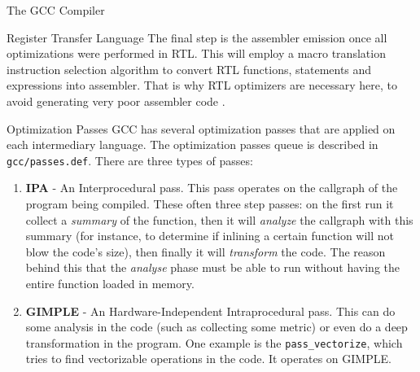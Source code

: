 \begin{section}{The GCC Compiler}
\begin{subsection}{Register Transfer Language}
	The final step is the assembler emission once all optimizations were
	performed in RTL. This will employ a macro translation instruction
	selection algorithm to convert RTL functions, statements and expressions
	into assembler. That is why RTL optimizers are necessary here, to avoid
	generating very poor assembler code \citep{gcc_insns_selection}.

%


\end{subsection}

\begin{subsection}{Optimization Passes}
	GCC has several optimization passes that are applied on each intermediary
	language. The optimization passes queue is described in
	\texttt{gcc/passes.def}. There are three types of passes:

    \begin{enumerate}
        \item \textbf{IPA} - An Interprocedural pass. This pass operates on the
		callgraph of the program being compiled. These often three step passes:
		on the first run it collect a \textit{summary} of the function, then
		it will \textit{analyze} the callgraph with this summary (for instance,
		to determine if inlining a certain function will not blow the code's size),
		then finally it will \textit{transform} the code. The reason behind this
		that the \textit{analyse} phase must be able to run without having the
		entire function loaded in memory.

        \item \textbf{GIMPLE} - An Hardware-Independent Intraprocedural pass.
		This can do some analysis in the code (such as collecting some metric)
		or even do a deep transformation in the program. One example is
		the \texttt{pass\_vectorize}, which tries to find vectorizable operations
		in the code. It operates on GIMPLE.


\end{enumerate}
\end{subsection}
\end{section}
